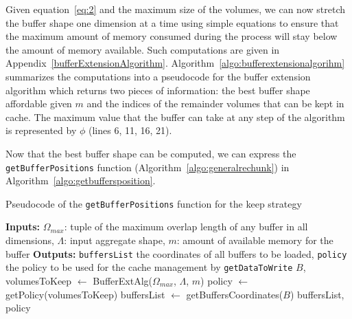 \documentclass[conference]{IEEEtran}
\begin{document}
Given equation~\ref{eq:2} and the maximum size of the volumes, we can now
stretch the buffer shape one dimension at a time using simple equations to ensure
that the maximum amount of memory consumed during the process will stay below the
amount of memory available. Such computations are given in
Appendix~\ref{bufferExtensionAlgorithm}.
Algorithm~\ref{algo:bufferextensionalgorihm} summarizes the computations into a
pseudocode for the buffer extension algorithm which returns two pieces of
information: the best buffer shape affordable given $m$ and the indices of the
remainder volumes that can be kept in cache. The maximum value that the buffer
can take at any step of the algorithm is represented by $\phi$ (lines 6, 11,
16, 21).

Now that the best buffer shape can be computed, we can express the
\texttt{getBufferPositions} function (Algorithm~\ref{algo:generalrechunk}) in
Algorithm~\ref{algo:getbuffersposition}.

\begin{algorithm}
  \caption{Pseudocode of the \texttt{getBufferPositions} function for the keep strategy}
  \label{algo:getbuffersposition}
  \begin{algorithmic}[1]
  \STATE \textbf{Inputs:} $\Omega_{max}$: tuple of the maximum overlap length
  of any buffer in all dimensions, $\Lambda$: input aggregate shape,
  $m$: amount of available memory for the buffer
  \STATE \textbf{Outputs:} \texttt{buffersList} the coordinates of all buffers to be loaded,
  \texttt{policy} the policy to be used for the cache management by \texttt{getDataToWrite}
  \STATE $B$, volumesToKeep $\leftarrow$ BufferExtAlg($\Omega_{max}$, $\Lambda$, $m$)
  \STATE policy $\leftarrow$ getPolicy(volumesToKeep)
  \STATE buffersList $\leftarrow$ getBuffersCoordinates($B$)
  \RETURN buffersList, policy
  \end{algorithmic}
\end{algorithm}
\end{document}
